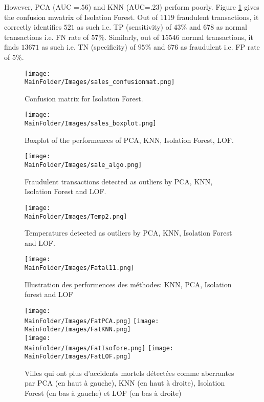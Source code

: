  \noindent However, PCA (AUC =$.56$) and KNN (AUC=$.23$) perform poorly. Figure \ref{fig_sal13} gives the confusion mwatrix of Isolation Forest. Out of $1119$ fraudulent transactions, it correctly identifies $521$ as such i.e. TP (sensitivity) of $43 \%$ and $678$ as normal  transactions i.e. FN rate of $ 57 \%$. Similarly, out of $15546$ normal transactions, it finds $13671$ as such i.e. TN (specificity) of $95 \%$  and $676$ as fraudulent i.e. FP  rate of $ 5\%$. 
\begin{figure}[H]
  
    \texttt{[image: \\MainFolder/Images/sales\_confusionmat.png]}
  \caption{Confusion matrix for Isolation Forest.}
    \label{fig_sal13}
\end{figure}

\begin{figure}[H]
    \texttt{[image: \\MainFolder/Images/sales\_boxplot.png]}
    \label{fig_sal12}
    \caption{Boxplot of the performences of PCA, KNN, Isolation Forest, LOF.}%
\end{figure}


\begin{figure*}[ht!]
    \centering
    \texttt{[image: \\MainFolder/Images/sale\_algo.png]}
    \caption{Fraudulent transactions detected as outliers by PCA, KNN, Isolation Forest and LOF.}%
    \label{fig_sal2}
    \texttt{[image: \\MainFolder/Images/Temp2.png]}
    \caption{Temperatures detected as outliers by PCA, KNN, Isolation Forest and LOF.}%
    \label{fig2t1}
\end{figure*}
\begin{figure*}[ht!]
 \centering
     \texttt{[image: \\MainFolder/Images/Fatal11.png]}
    \caption{Illustration des performences des méthodes: KNN, PCA, Isolation forest and LOF}%
    \label{fig3}
\end{figure*}

\begin{figure*}[ht]
    \centering
    \texttt{[image: \\MainFolder/Images/FatPCA.png]}
    \texttt{[image: \\MainFolder/Images/FatKNN.png]}\\
    \texttt{[image: \\MainFolder/Images/FatIsofore.png]}
    \texttt{[image: \\MainFolder/Images/FatLOF.png]}
    \caption{Villes qui ont plus d'accidents mortels détectées comme aberrantes par PCA (en haut à gauche), KNN (en haut à droite), Isolation Forest (en bas à gauche) et LOF (en bas à droite)}%
    \label{fig2b}
\end{figure*}


\afterpage{\FloatBarrier}
